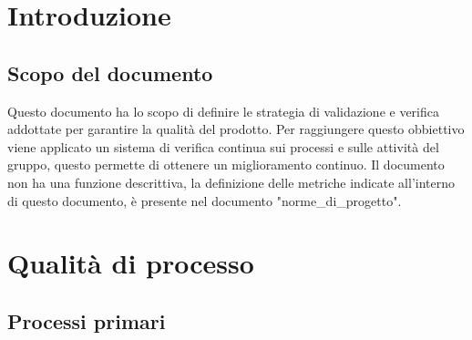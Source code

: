 \documentclass[12pt]{article}
\begin{document}
\tableofcontents
\pagebreak

\printindex



\section{Introduzione}
\subsection{Scopo del documento}
Questo documento ha lo scopo di definire le strategia di validazione e verifica addottate per garantire la qualità del prodotto.
Per raggiungere questo obbiettivo viene applicato un sistema di verifica continua sui processi e sulle attività del gruppo, questo permette di ottenere un miglioramento continuo.
Il documento non ha una funzione descrittiva, la definizione delle metriche indicate all'interno di questo documento, è presente nel documento "norme\_di\_progetto".
\section{Qualità di processo}

\subsection{Processi primari}
\end{document}
